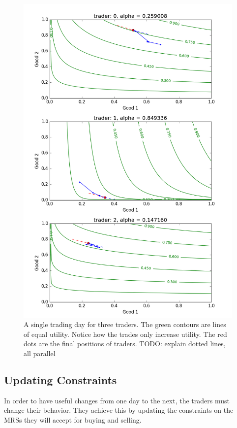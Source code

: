 \documentclass[12pt,a4paper,titlepage]{article}
\begin{document}
\begin{figure}[h]
    \centering
    \includegraphics[width=\textwidth]{allocations_(seed_13).png}
    \caption{
      A single trading day for three traders.
      The green contours are lines of equal utility.
      Notice how the trades only increase utility.
      The red dots are the final positions of traders.
      TODO: explain dotted lines, all parallel
    }
    \label{fig:day}
\end{figure}

\subsection{Updating Constraints}
In order to have useful changes from one day to the next, the traders must change their behavior.
They achieve this by updating the constraints on the MRSs they will accept for buying and selling.
\end{document}
